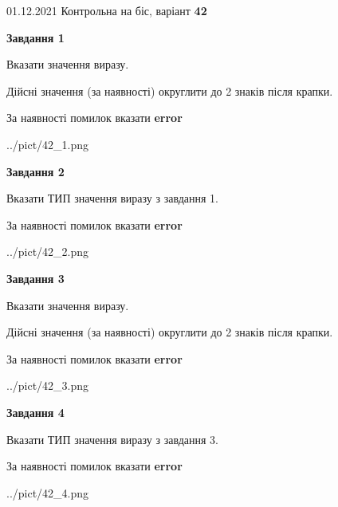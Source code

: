 \documentclass[11pt, ukrainian]{article}
\begin{document}
{01.12.2021 Контрольна на біс, варіант  \No \textbf { 42 }\par}
{
\begin {large}
{\begin {center}\textbf{Завдання 1}\end {center}}\par
Вказати значення виразу. \par
Дійсні значення (за наявності) округлити до 2 знаків після крапки. \par
За наявності помилок вказати \textbf{error}

\begin{center}
	{../pict/42_1.png}
\end{center}
\newpage

{\begin {center}\textbf{Завдання 2}\end {center}}\par
Вказати ТИП значення виразу з завдання 1. \par
За наявності помилок вказати \textbf{error}

\begin{center}
	{../pict/42_2.png}
\end{center}
\newpage

{\begin {center}\textbf{Завдання 3}\end {center}}\par
Вказати значення виразу. \par
Дійсні значення (за наявності) округлити до 2 знаків після крапки. \par
За наявності помилок вказати \textbf{error}

\begin{center}
	{../pict/42_3.png}
\end{center}
\newpage

{\begin {center}\textbf{Завдання 4}\end {center}}\par
Вказати ТИП значення виразу з завдання 3. \par
За наявності помилок вказати \textbf{error}

\begin{center}
	{../pict/42_4.png}
\end{center}
\newpage


\end{large}}
\end{document}

